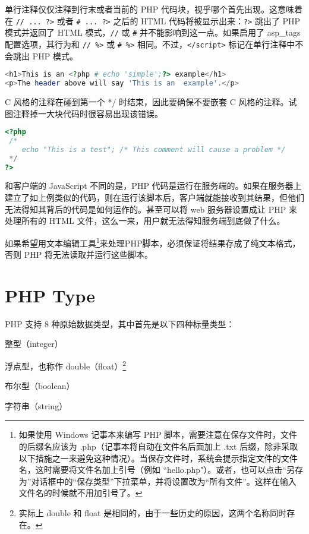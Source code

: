 单行注释仅仅注释到行末或者当前的 PHP 代码块，视乎哪个首先出现。这意味着在 \texttt{// ... ?>} 或者 \texttt{\# ... ?>} 之后的 HTML 代码将被显示出来：\texttt{?>} 跳出了 PHP 模式并返回了 HTML 模式，\texttt{//} 或 \texttt{\#} 并不能影响到这一点。如果启用了 asp\_tags 配置选项，其行为和 \texttt{// \%>} 或 \texttt{\# \%>} 相同。不过，\texttt{</script>} 标记在单行注释中不会跳出 PHP 模式。

\begin{lstlisting}[language=PHP]
<h1>This is an <?php # echo 'simple';?> example</h1>
<p>The header above will say 'This is an  example'.</p>
\end{lstlisting}

C 风格的注释在碰到第一个 */ 时结束，因此要确保不要嵌套 C 风格的注释。试图注释掉一大块代码时很容易出现该错误。

\begin{lstlisting}[language=PHP]
<?php
 /*
    echo "This is a test"; /* This comment will cause a problem */
 */
?>
\end{lstlisting}

和客户端的 JavaScript 不同的是，PHP 代码是运行在服务端的。如果在服务器上建立了如上例类似的代码，则在运行该脚本后，客户端就能接收到其结果，但他们无法得知其背后的代码是如何运作的。甚至可以将 web 服务器设置成让 PHP 来处理所有的 HTML 文件，这么一来，用户就无法得知服务端到底做了什么。

如果希望用文本编辑工具\footnote{如果使用 Windows 记事本来编写 PHP 脚本，需要注意在保存文件时，文件的后缀名应该为 .php（记事本将自动在文件名后面加上 .txt 后缀，除非采取以下措施之一来避免这种情况）。当保存文件时，系统会提示指定文件的文件名，这时需要将文件名加上引号（例如 ``hello.php"）。或者，也可以点击“另存为”对话框中的“保存类型”下拉菜单，并将设置改为“所有文件”。这样在输入文件名的时候就不用加引号了。}来处理PHP脚本，必须保证将结果存成了纯文本格式，否则 PHP 将无法读取并运行这些脚本。


\chapter{PHP Type}


PHP 支持 8 种原始数据类型，其中首先是以下四种标量类型：

\begin{compactitem}
\item 整型（integer）
\item 浮点型，也称作 double（float）\footnote{实际上 double 和 float 是相同的，由于一些历史的原因，这两个名称同时存在。}
\item 布尔型（boolean）
\item 字符串（string）
\end{compactitem}

